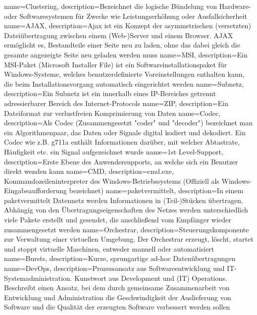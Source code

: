{
    name=Clustering,
    description={Bezeichnet die logische Bündelung von Hardware- oder Softwaresystemen für Zwecke wie Leistungserhöhung oder Ausfallsicherheit}
}
{
    name=AJAX,
    description={Ajax ist ein Konzept der asymmetrischen (versetzten) Dateiübertragung zwischen einem (Web-)Server und einem Browser. AJAX ermöglicht es, Bestandteile einer Seite neu zu laden, ohne das dabei gleich die gesamte angezeigte Seite neu geladen werden muss}
}
{
    name=MSI,
    description={Ein \acrshort{MSI}-Paket (Microsoft Installer File) ist ein Softwareinstallationspaket für Windows-Systeme, welches benutzerdefinierte Voreinstellungen enthalten kann, die beim Installationsvorgang automatisch eingerichtet werden}
}
{
    name=Subnetz,
    description={Ein Subnetz ist ein innerhalb eines IP-Bereiches getrennt adressierbarer Bereich des Internet-Protocols}
}
{
    name=ZIP,
    description={Ein Dateiformat zur verlustfreien Komprimierung von Daten}
}
{
    name=Codec,
    description={Als Codec (Zusammengesetzt "coder" und "decoder") bezeichnet man ein Algorithmenpaar, das Daten oder Signale digital kodiert und dekodiert. Ein Codec wie z.B. g711a enthält Informationen darüber, mit welcher Abtastrate, Häufigkeit etc. ein Signal aufgezeichnet wurde}
}
{
    name=1st Level-Support,
    description={Erste Ebene des Anwendersupports, an welche sich ein Benutzer direkt wenden kann}
}
{
    name=CMD,
    description={cmd.exe, Kommandozeileninterpreter des Windows-Betriebssystems (Offiziell als Windows-Eingabeaufforderung bezeichnet)}
}
{
    name=paketvermittelt,
    description={In einem paketvermittelt Datennetz werden Informationen in (Teil-)Stücken übertragen. Abhängig von den Übertragungseigenschaften des Netzes werden unterschiedlich viele Pakete erstellt und gesendet, die anschließend vom Empfänger wieder zusammengesetzt werden}
}
{
    name=Orchestrar,
    description={Steuerungskomponente zur Verwaltung einer virtuellen Umgebung. Der Orchestrar erzeugt, löscht, startet und stoppt virtuelle Maschinen, entweder manuell oder automatisiert}
}
{
    name=Bursts,
    description={Kurze, sprungartige ad-hoc Datenübertragungen}
}
{
    name=DevOps,
    description={Prozessansatz aus Softwareentwicklung und IT-Systemadministration. Kunstwort aus Development und (IT) Operations. Beschreibt einen Ansatz, bei dem durch gemeinsame Zusammenarbeit von Entwicklung und Administration die Geschwindigkeit der Auslieferung von Software und die Qualität der erzeugten Software verbessert werden sollen}
}
